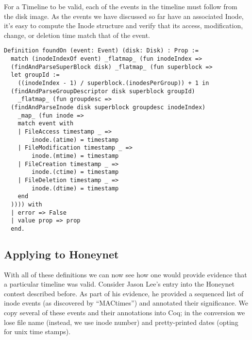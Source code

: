 \documentclass[nocopyrightspace]{sigplanconf}
\begin{document}
For a Timeline to be valid, each of the events in the timeline must follow
from the disk image. As the events we have discussed so far have an associated
Inode, it's easy to compute the Inode structure and verify that its access,
modification, change, or deletion time match that of the event.

\begin{lstlisting}
Definition foundOn (event: Event) (disk: Disk) : Prop :=
  match (inodeIndexOf event) _flatmap_ (fun inodeIndex =>
  (findAndParseSuperBlock disk) _flatmap_ (fun superblock =>
  let groupId := 
    ((inodeIndex - 1) / superblock.(inodesPerGroup)) + 1 in
  (findAndParseGroupDescriptor disk superblock groupId)
    _flatmap_ (fun groupdesc =>
  (findAndParseInode disk superblock groupdesc inodeIndex) 
    _map_ (fun inode =>
    match event with
    | FileAccess timestamp _ => 
        inode.(atime) = timestamp
    | FileModification timestamp _ => 
        inode.(mtime) = timestamp
    | FileCreation timestamp _ => 
        inode.(ctime) = timestamp
    | FileDeletion timestamp _ => 
        inode.(dtime) = timestamp
    end
  )))) with
  | error => False
  | value prop => prop
  end.
\end{lstlisting}

\subsection{Applying to Honeynet}
With all of these definitions we can now see how one would provide evidence
that a particular timeline was valid. Consider Jason Lee's entry\cite{lee}
into the Honeynet contest described before. As part of his evidence, he
provided a sequenced list of inode events (as discovered by ``MACtimes'') and
annotated their significance. We copy several of these events and their
annotations into Coq; in the conversion we lose file name (instead, we use
inode number) and pretty-printed dates (opting for unix time stamps).
\end{document}
